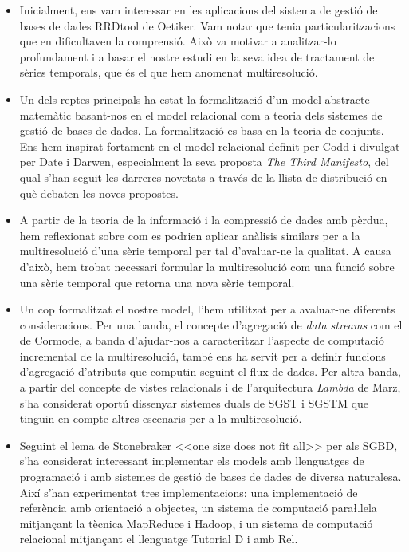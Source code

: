 \documentclass{article}
\begin{document}
\begin{itemize}
\item Inicialment, ens vam interessar en les aplicacions del sistema
  de gestió de bases de dades RRDtool de Oetiker. Vam notar que tenia
  particularitzacions que en dificultaven la comprensió.  Això va
  motivar a analitzar-lo profundament i a basar el nostre estudi en la
  seva idea de tractament de sèries temporals, que és el que hem
  anomenat multiresolució.


\item Un dels reptes principals ha estat la formalització d'un model
  abstracte matemàtic basant-nos en el model relacional com a teoria
  dels sistemes de gestió de bases de dades. La formalització es basa
  en la teoria de conjunts. Ens hem inspirat fortament en el model
  relacional definit per Codd i divulgat per Date i Darwen,
  especialment la seva proposta \emph{The Third Manifesto}, del qual
  s'han seguit les darreres novetats a través de la llista de
  distribució en què debaten les noves propostes.

\item A partir de la teoria de la informació i la compressió de dades
  amb pèrdua, hem reflexionat sobre com es podrien aplicar anàlisis similars
  per a la multiresolució d'una sèrie temporal per tal d'avaluar-ne la
  qualitat. A causa d'això, hem trobat necessari formular la
  multiresolució com una funció sobre una sèrie temporal que retorna
  una nova sèrie temporal.

\item Un cop formalitzat el nostre model, l'hem utilitzat per a
  avaluar-ne diferents consideracions. Per una banda, el concepte
  d'agregació de \emph{data streams} com el de Cormode, a banda
  d'ajudar-nos a caracteritzar l'aspecte de computació incremental de
  la multiresolució, també ens ha servit per a definir funcions
  d'agregació d'atributs que computin seguint el flux de dades.  Per
  altra banda, a partir del concepte de vistes relacionals i de
  l'arquitectura \emph{Lambda} de Marz, s'ha considerat oportú dissenyar
  sistemes duals de SGST i SGSTM que tinguin en compte altres
  escenaris per a la multiresolució.

\item Seguint el lema de Stonebraker <<one size does not fit all>> per
  als SGBD, s'ha considerat interessant implementar els models amb
  llenguatges de programació i amb sistemes de gestió de bases de
  dades de diversa naturalesa. Així s'han experimentat tres
  implementacions: una implementació de referència amb orientació a
  objectes, un sistema de computació para\l.lela mitjançant la tècnica
  MapReduce i Hadoop, i un sistema de computació relacional mitjançant
  el llenguatge Tutorial D i amb Rel.




\end{itemize}
\end{document}
